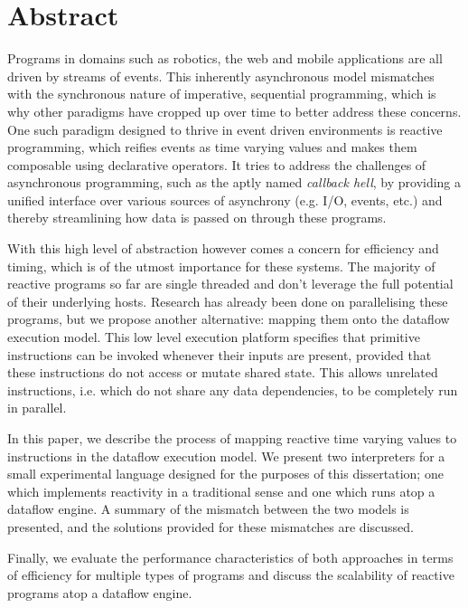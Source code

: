 \section*{Abstract}

Programs in domains such as robotics, the web and mobile applications are all driven by streams of events. This inherently asynchronous model mismatches with the synchronous nature of imperative, sequential programming, which is why other paradigms have cropped up over time to better address these concerns. One such paradigm designed to thrive in event driven environments is reactive programming, which reifies events as time varying values and makes them composable using declarative operators. It tries to address the challenges of asynchronous programming, such as the aptly named \textit{callback hell}, by providing a unified interface over various sources of asynchrony (e.g. I/O, events, etc.) and thereby streamlining how data is passed on through these programs.

With this high level of abstraction however comes a concern for efficiency and timing, which is of the utmost importance for these systems. The majority of reactive programs so far are single threaded and don't leverage the full potential of their underlying hosts.  Research has already been done on parallelising these programs, but we propose another alternative: mapping them onto the dataflow execution model. This low level execution platform specifies that primitive instructions can be invoked whenever their inputs are present, provided that these instructions do not access or mutate shared state. This allows unrelated instructions, i.e. which do not share any data dependencies, to be completely run in parallel.

In this paper, we describe the process of mapping reactive time varying values to instructions in the dataflow execution model. We present two interpreters for a small experimental language designed for the purposes of this dissertation; one which implements reactivity in a traditional sense and one which runs atop a dataflow engine. 
A summary of the mismatch between the two models is presented, and the solutions provided for these mismatches are discussed. 

Finally, we evaluate the performance characteristics of both approaches in terms of efficiency for multiple types of programs and discuss the scalability of reactive programs atop a dataflow engine.
            